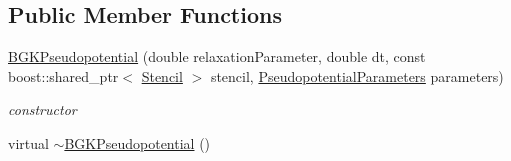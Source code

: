 \subsection*{Public Member Functions}
\begin{DoxyCompactItemize}
\item 
\hypertarget{classnatrium_1_1BGKPseudopotential_a4400bbf5701254f4cf4363879db54257}{
\hyperlink{classnatrium_1_1BGKPseudopotential_a4400bbf5701254f4cf4363879db54257}{BGKPseudopotential} (double relaxationParameter, double dt, const boost::shared\_\-ptr$<$ \hyperlink{classnatrium_1_1Stencil}{Stencil} $>$ stencil, \hyperlink{structnatrium_1_1PseudopotentialParameters}{PseudopotentialParameters} parameters)}
\label{classnatrium_1_1BGKPseudopotential_a4400bbf5701254f4cf4363879db54257}

\begin{DoxyCompactList}\small\item\em constructor \item\end{DoxyCompactList}\item 
\hypertarget{classnatrium_1_1BGKPseudopotential_a32db75cae893a1d1526f7e18358e5175}{
virtual \hyperlink{classnatrium_1_1BGKPseudopotential_a32db75cae893a1d1526f7e18358e5175}{$\sim$BGKPseudopotential} ()}
\label{classnatrium_1_1BGKPseudopotential_a32db75cae893a1d1526f7e18358e5175}


\end{DoxyCompactItemize}

